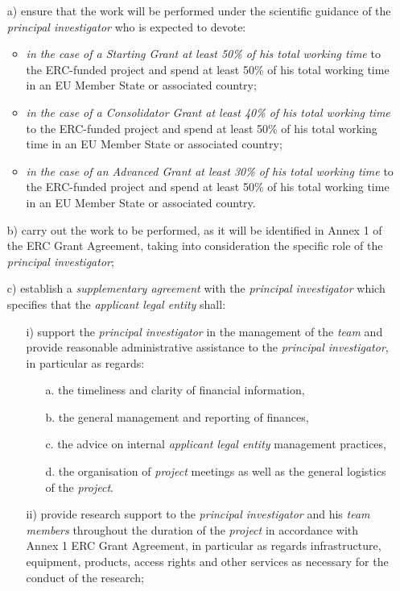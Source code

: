 \documentclass[a4paper,11pt,ngerman,numbers=noenddot]{scrreprt}
\begin{document}
\begin{itemize}
\item[a)] 
ensure that the work will be performed under the scientific guidance of the \textit{principal investigator} who is expected to devote:
\begin{itemize}
\item \textit{in the case of a Starting Grant at least 50\% of his total working time} to the ERC-funded project and spend at least 50\% of his total working time in an EU Member State or associated country;
\item \textit{in the case of a Consolidator Grant at least 40\% of his total working time} to the ERC-funded project and spend at least 50\% of his total working time in an EU Member State or associated country;
\item \textit{in the case of an Advanced Grant at least 30\% of his total working time} to the ERC-funded project and spend at least 50\% of his total working time in an EU Member State or associated country.
\end{itemize}
\item[b)] carry out the work to be performed, as it will be identified in Annex 1 of the ERC Grant Agreement, taking into consideration the specific role of the \textit{principal investigator};
\item[c)] establish a \textit{supplementary agreement} with the \textit{principal investigator} which specifies that the \textit{applicant legal entity} shall:
\begin{itemize}
\item[i)] support the \textit{principal investigator} in the management of the \textit{team} and provide reasonable administrative assistance to the \textit{principal investigator}, in particular as regards:
\begin{itemize}
\item[a.] the timeliness and clarity of financial information,
\item[b.] the general management and reporting of finances,
\item[c.] the advice on internal \textit{applicant legal entity} management practices,
\item[d.] the organisation of \textit{project} meetings as well as the general logistics of the \textit{project}.
\end{itemize}
\item[ii)] provide research support to the \textit{principal investigator} and his \textit{team
members} throughout the duration of the \textit{project} in accordance with Annex 1 ERC Grant Agreement, in particular as regards infrastructure, equipment, products, access rights and other services as necessary for the conduct of the research;

\end{itemize}
\end{itemize}
\end{document}
